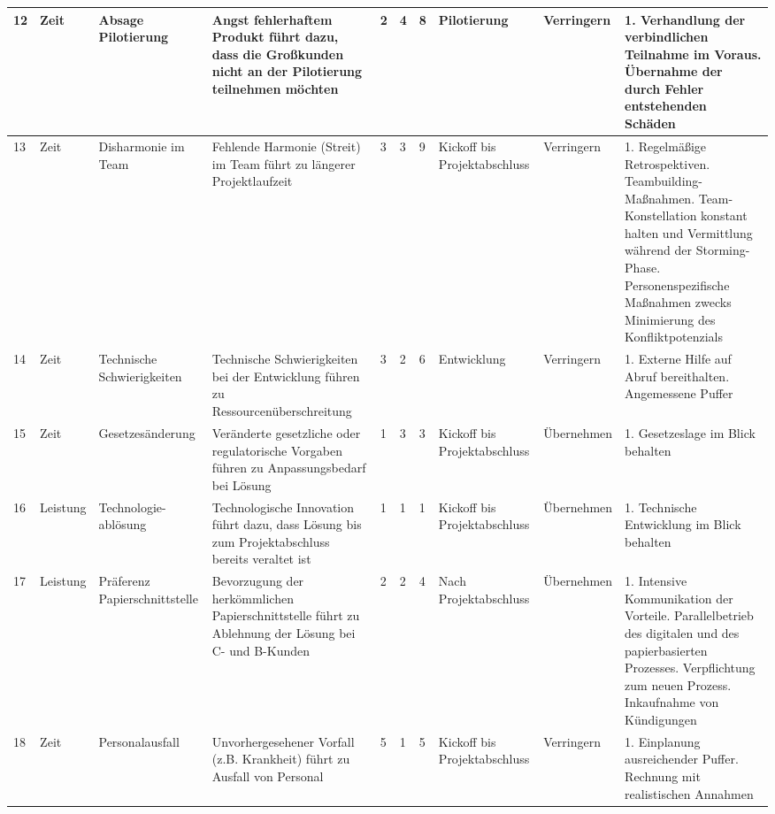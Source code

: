 \begin{landscape}
\begin{longtable}{| P{0.5cm} | P{1.7cm} | P{3cm} | P{5cm} | P{1cm} | P{1cm} | P{1cm} | P{2.2cm} | P{2cm} | P{5cm} |}
	12&Zeit&Absage Pilotierung&Angst fehlerhaftem Produkt führt dazu, dass die Großkunden nicht an der Pilotierung teilnehmen möchten&2&4&8&Pilotierung&Verringern&
	1. Verhandlung der verbindlichen Teilnahme im Voraus. Übernahme der durch Fehler entstehenden Schäden\\ 
	\hline
		
	13&Zeit&Disharmonie im Team&Fehlende Harmonie (Streit) im Team führt zu längerer Projektlaufzeit&3&3&9&Kickoff bis Projektabschluss&Verringern&
	1. Regelmäßige Retrospektiven. Teambuilding-Maßnahmen. Team-Konstellation konstant halten und Vermittlung während der Storming-Phase. Personenspezifische Maßnahmen zwecks Minimierung des Konfliktpotenzials\\ 
	\hline
	
	14&Zeit&Technische Schwierigkeiten&Technische Schwierigkeiten bei der Entwicklung führen zu Ressourcenüberschreitung&3&2&6&Entwicklung&Verringern&
	1. Externe Hilfe auf Abruf bereithalten. Angemessene Puffer\\
	\hline
	
	15&Zeit&Gesetzesänderung&Veränderte gesetzliche oder regulatorische Vorgaben führen zu Anpassungsbedarf bei Lösung&1&3&3&Kickoff bis Projektabschluss&Übernehmen&
	1. Gesetzeslage im Blick behalten\\ 
	\hline
	
	16&Leistung&Technologie-ablösung&Technologische Innovation führt dazu, dass Lösung bis zum Projektabschluss bereits veraltet ist&1&1&1&Kickoff bis Projektabschluss&Übernehmen&
	1. Technische Entwicklung im Blick behalten\\
	\hline
	
	17&Leistung&Präferenz Papierschnittstelle&Bevorzugung der herkömmlichen Papierschnittstelle führt zu Ablehnung der Lösung bei C- und B-Kunden&2&2&4&Nach Projektabschluss&Übernehmen& 
	1. Intensive Kommunikation der Vorteile. Parallelbetrieb des digitalen und des papierbasierten Prozesses. Verpflichtung zum neuen Prozess. Inkaufnahme von Kündigungen\\ 
	\hline
	
	18&Zeit&Personalausfall&Unvorhergesehener Vorfall (z.B. Krankheit) führt zu Ausfall von Personal&5&1&5&Kickoff bis Projektabschluss&Verringern&
	1. Einplanung ausreichender Puffer. Rechnung mit realistischen Annahmen\\ 
	\hline


\end{longtable}
\end{landscape}
